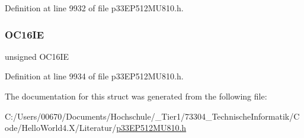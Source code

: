 Definition at line 9932 of file p33\+E\+P512\+M\+U810.\+h.

\mbox{\label{structtag_i_e_c8_b_i_t_s_af4184a5bd4a99c4516b2c1f3682709ab}} 
\subsubsection{\texorpdfstring{O\+C16\+IE}{OC16IE}}
{\footnotesize\ttfamily unsigned O\+C16\+IE}



Definition at line 9934 of file p33\+E\+P512\+M\+U810.\+h.



The documentation for this struct was generated from the following file\+:\begin{DoxyCompactItemize}
\item 
C\+:/\+Users/00670/\+Documents/\+Hochschule/\+\_\+\+Tier1/73304\+\_\+\+Technische\+Informatik/\+Code/\+Hello\+World4.\+X/\+Literatur/\hyperlink{p33_e_p512_m_u810_8h}{p33\+E\+P512\+M\+U810.\+h}\end{DoxyCompactItemize}
